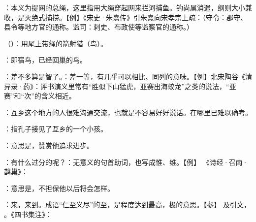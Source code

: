 {
\item {}：本义为提网的总绳，这里指用大绳穿起网来拦河捕鱼。钓尚属消遣，纲则大小兼收，是灭绝式捕捞。【例】《宋史·朱熹传》引朱熹向宋孝宗上疏：（守令：郡守、县令等地方官的通称。监司：刺史、布政使等监察官的通称。）
\item {}（）：用尾上带绳的箭射猎（鸟）。
\item {}：即宿鸟，已经回巢的鸟。
}
{}



{
\item {}：差不多算是智了。：差一等，有几乎可以相比、同列的意味。【例】北宋陶谷《清异录·药》：评书演义里常有“胜似下山猛虎，亚赛出海蛟龙”之类的说法，“亚赛”和“次”的含义相近。
}
{}  %


{
\item {}：互乡这个地方的人很难沟通交流，也就是不容易好好说话。在哪里已难以确考。
\item {}：指孔子接见了互乡的一个小孩。
\item {}：意思是，赞赏他追求进步。
\item {}：有什么过分的呢？：无意义的句首助词，也写成惟、维。【例】 《诗经·召南·鹊巢》：
\item {}：意思是，不担保他以后将会怎样。
}
{}  %


{
\item {}：来，来到。成语“仁至义尽”的至，是程度达到最高，极的意思。【参】 及引文， 。《四书集注》：
}
{} %


